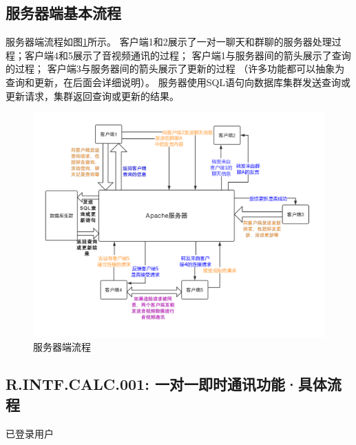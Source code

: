     \subsection{服务器端基本流程}
    服务器端流程如图\ref{fig:server_flow}所示。
    客户端1和2展示了一对一聊天和群聊的服务器处理过程；客户端4和5展示了音视频通讯的过程；
    客户端1与服务器间的箭头展示了查询的过程；
    客户端3与服务器间的箭头展示了更新的过程
    （许多功能都可以抽象为查询和更新，在后面会详细说明）。
    服务器使用SQL语句向数据库集群发送查询或更新请求，集群返回查询或更新的结果。
        \begin{figure}[h]
            \centering
            \includegraphics[scale=0.4]{OutlineDesign/figures/server_flow.png}
            \caption{服务器端流程}
            \label{fig:server_flow}
        \end{figure}
    \subsection{R.INTF.CALC.001: 一对一即时通讯功能·具体流程}
        已登录用户
